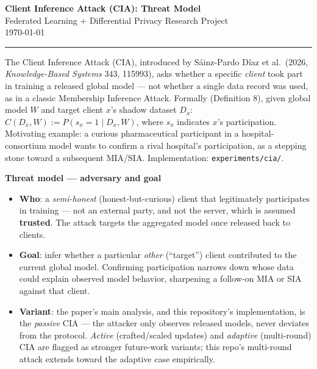 \documentclass[10pt]{article}
\newcommand{\code}[1]{\texttt{\small #1}}
\begin{document}
{\centering\large\textbf{Client Inference Attack (CIA): Threat Model}\\[2pt]
\small Federated Learning + Differential Privacy Research Project \\ \today\par}
\vspace{4pt}
\hrule
\vspace{6pt}

\small
The Client Inference Attack (CIA), introduced by S\'ainz-Pardo D\'iaz et al.\ (2026,
\emph{Knowledge-Based Systems} 343, 115993), asks whether a specific \emph{client} took part in
training a released global model --- not whether a single data record was used, as in a classic
Membership Inference Attack. Formally (Definition 8), given global model $W$ and target client
$x$'s shadow dataset $D_x$: $C(D_x, W) := P(s_x = 1 \mid D_x, W)$, where $s_x$ indicates $x$'s
participation. Motivating example: a curious pharmaceutical participant in a hospital-consortium
model wants to confirm a rival hospital's participation, as a stepping stone toward a subsequent
MIA/SIA. Implementation: \code{experiments/cia/}.

\vspace{3pt}
\textbf{Threat model --- adversary and goal}
\begin{itemize}
    \item \textbf{Who}: a \emph{semi-honest} (honest-but-curious) client that legitimately
    participates in training --- not an external party, and not the server, which is assumed
    \textbf{trusted}. The attack targets the aggregated model once released back to clients.
    \item \textbf{Goal}: infer whether a particular \emph{other} (``target'') client contributed to
    the current global model. Confirming participation narrows down whose data could explain
    observed model behavior, sharpening a follow-on MIA or SIA against that client.
    \item \textbf{Variant}: the paper's main analysis, and this repository's implementation, is the
    \emph{passive} CIA --- the attacker only observes released models, never deviates from the
    protocol. \emph{Active} (crafted/scaled updates) and \emph{adaptive} (multi-round) CIA are
    flagged as stronger future-work variants; this repo's multi-round attack extends toward the
    adaptive case empirically.
\end{itemize}
\end{document}
